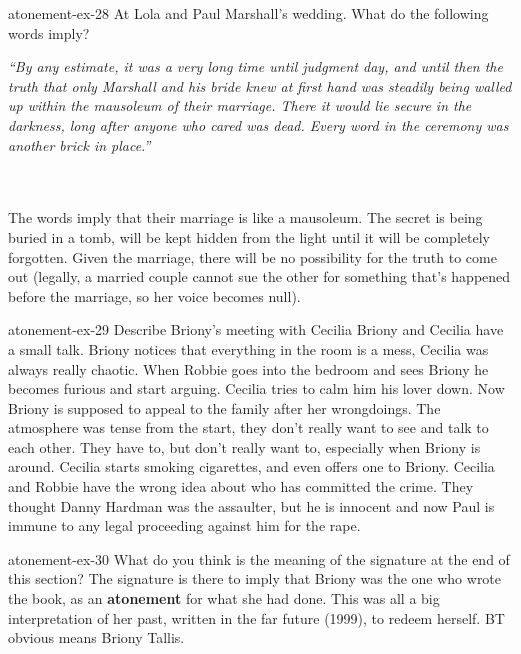 \documentclass[preview]{standalone}
\begin{document}
\begin{snippetexercise}{atonement-ex-28}
    {At Lola and Paul Marshall's wedding. What do the following words imply?}
    \hspace{0.1\textwidth}
    \begin{minipage}[r]{0.8\textwidth}
        \itshape
        “By any estimate, it was a very long time until judgment day, and until then the truth that only
        Marshall and his bride knew at first hand was steadily being walled up within the mausoleum of
        their marriage. There it would lie secure in the darkness, long after anyone who cared was dead.
        Every word in the ceremony was another brick in place.” 
    \end{minipage}
    \\\\
    The words imply that their marriage is like a mausoleum.
    The secret is being buried in a tomb, will be kept hidden from the light until
    it will be completely forgotten.
    Given the marriage, there will be no possibility for the truth to come out
    (legally, a married couple cannot sue the other for something that's happened
    before the marriage, so her voice becomes null).
\end{snippetexercise}

\begin{snippetexercise}{atonement-ex-29}
    {Describe Briony's meeting with Cecilia}
    Briony and Cecilia have a small talk. Briony notices that everything in the room
    is a mess, Cecilia was always really chaotic.
    When Robbie goes into the bedroom and sees Briony he becomes furious
    and start arguing. Cecilia tries to calm him his lover down.
    Now Briony is supposed to appeal to the family after her wrongdoings.
    The atmosphere was tense from the start, they don't really want to see and talk to each other.
    They have to, but don't really want to, especially when Briony is around.
    Cecilia starts smoking cigarettes, and even offers one to Briony.
    Cecilia and Robbie have the wrong idea about who has committed the crime.
    They thought Danny Hardman was the assaulter, but he is innocent and now
    Paul is immune to any legal proceeding against him for the rape.
\end{snippetexercise}

\begin{snippetexercise}{atonement-ex-30}
    {What do you think is the meaning of the signature at the end of this section?}
    The signature is there to imply that Briony was the one who wrote the book,
    as an \textbf{atonement} for what she had done.
    This was all a big interpretation of her past,
    written in the far future (1999),
    to redeem herself.
    BT obvious means Briony Tallis.
\end{snippetexercise}
\end{document}
